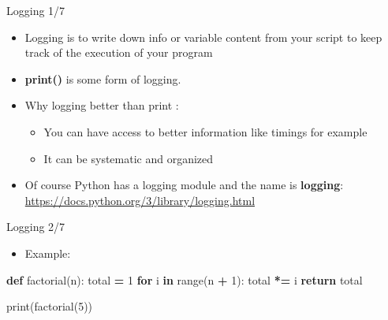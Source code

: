 \documentclass[
  8pt,
  ignorenonframetext,
]{beamer}
\newenvironment{Shaded}{\begin{snugshade}}{\end{snugshade}}
\newcommand{\BuiltInTok}[1]{#1}
\newcommand{\ControlFlowTok}[1]{\textcolor[rgb]{0.13,0.29,0.53}{\textbf{#1}}}
\newcommand{\DecValTok}[1]{\textcolor[rgb]{0.00,0.00,0.81}{#1}}
\newcommand{\KeywordTok}[1]{\textcolor[rgb]{0.13,0.29,0.53}{\textbf{#1}}}
\newcommand{\NormalTok}[1]{#1}
\newcommand{\OperatorTok}[1]{\textcolor[rgb]{0.81,0.36,0.00}{\textbf{#1}}}
\providecommand{\tightlist}{%
  \setlength{\itemsep}{0pt}\setlength{\parskip}{0pt}}
\begin{document}
\begin{frame}{Logging 1/7}
\protect\hypertarget{logging-17}{}
\begin{itemize}
\item
  Logging is to write down info or variable content from your script to
  keep track of the execution of your program
\item
  \textbf{print()} is some form of logging.
\item
  Why logging better than print :

  \begin{itemize}
  \tightlist
  \item
    You can have access to better information like timings for example
  \item
    It can be systematic and organized
  \end{itemize}
\item
  Of course Python has a logging module and the name is
  \textbf{logging}: \url{https://docs.python.org/3/library/logging.html}
\end{itemize}
\end{frame}

\begin{frame}[fragile]{Logging 2/7}
\protect\hypertarget{logging-27}{}
\begin{itemize}
\tightlist
\item
  Example:
\end{itemize}

\begin{Shaded}
\begin{Highlighting}[]
\KeywordTok{def}\NormalTok{ factorial(n):}
\NormalTok{    total }\OperatorTok{=} \DecValTok{1}
    \ControlFlowTok{for}\NormalTok{ i }\KeywordTok{in} \BuiltInTok{range}\NormalTok{(n }\OperatorTok{+} \DecValTok{1}\NormalTok{):}
\NormalTok{        total }\OperatorTok{*=}\NormalTok{ i}
    \ControlFlowTok{return}\NormalTok{ total}

\BuiltInTok{print}\NormalTok{(factorial(}\DecValTok{5}\NormalTok{))}
\end{Highlighting}
\end{Shaded}
\end{frame}
\end{document}
